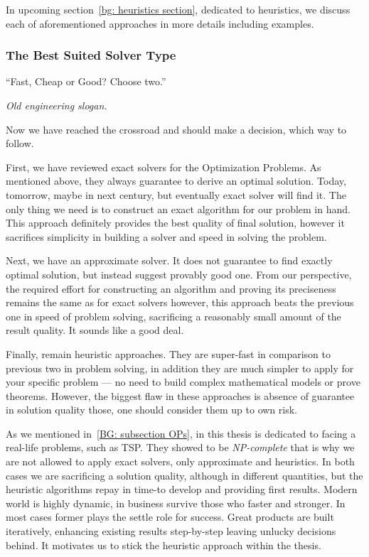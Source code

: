 In upcoming section~\ref{bg: heuristics section}, dedicated to heuristics, we discuss each of aforementioned approaches in more details including examples.


\subsubsection{The Best Suited Solver Type}
\epigraph{``Fast, Cheap or Good? Choose two.''}{\textit{Old engineering slogan.}}

Now we have reached the crossroad and should make a decision, which way to follow.

First, we have reviewed exact solvers for the Optimization Problems. As mentioned above, they always guarantee to derive an optimal solution. Today, tomorrow, maybe in next century, but eventually exact solver will find it. The only thing we need is to construct an exact algorithm for our problem in hand. This approach definitely provides the best quality of final solution, however it sacrifices simplicity in building a solver and speed in solving the problem.

Next, we have an approximate solver. It does not guarantee to find exactly optimal solution, but instead suggest provably good one. From our perspective, the required effort for constructing an algorithm and proving its preciseness remains the same as for exact solvers however, this approach beats the previous one in speed of problem solving, sacrificing a reasonably small amount of the result quality. It sounds like a good deal.

Finally, remain heuristic approaches. They are super-fast in comparison to previous two in problem solving, in addition they are much simpler to apply for your specific problem — no need to build complex mathematical models or prove theorems. However, the biggest flaw in these approaches is absence of guarantee in solution quality those, one should consider them up to own risk.

As we mentioned in~\ref{BG: subsection OPs}, in this thesis is dedicated to facing a real-life problems, such as TSP. They showed to be \textit{NP-complete} that is why we are not allowed to apply exact solvers, only approximate and heuristics. In both cases we are sacrificing a solution quality, although in different quantities, but the heuristic algorithms repay in time-to develop and providing first results. Modern world is highly dynamic, in business survive those who faster and stronger. In most cases former plays the settle role for success. Great products are built iteratively, enhancing existing results step-by-step leaving unlucky decisions behind. It motivates us to stick the heuristic approach within the thesis.

